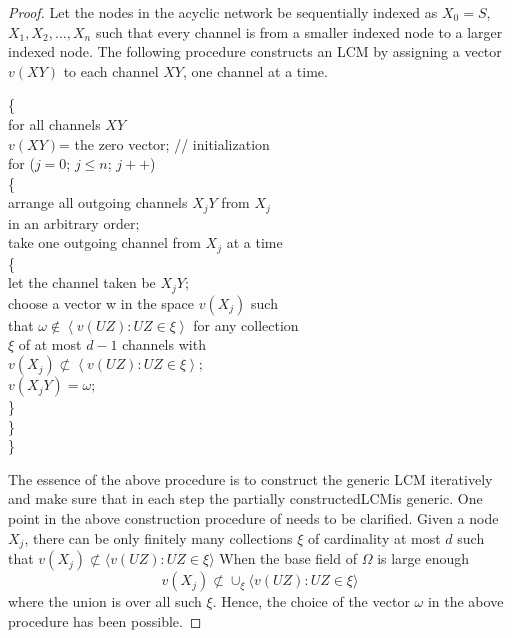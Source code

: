\documentclass[journal]{IEEEtran}
\newtheorem*{proof}{\hskip 2em Proof}
\begin{document}
\begin{proof}
	Let the nodes in the acyclic network be sequentially indexed as $X_0=S$, $X_1,X_2, \dots, X_n$ such that every channel is from a smaller indexed node to a larger indexed node. The following procedure constructs an LCM by assigning a vector $v(XY)$ to each channel $XY$, one channel at a time.
	\begin{tabbing}
		\{\\
		\quad for all channels $XY$\\
		\quad \quad $v(XY)$= the zero vector; // initialization\\
		\quad for ($j = 0$; $j \leq n$; $j++$)\\
		\quad \quad \{\\
		\quad \quad \quad arrange all outgoing channels $X_jY$ from $X_j$\\
		\quad \quad \quad in an arbitrary order;\\
		\quad \quad \quad take one outgoing channel from $X_j$ at a time\\
		\quad \quad \quad \{\\
		\quad \quad \quad \quad let the channel taken be $X_jY$;\\
		\quad \quad \quad \quad choose a vector w in the space $v(X_j)$ such\\
		\quad \quad \quad \quad that $\omega\notin\left \langle v(UZ):UZ\in \xi\right \rangle$ for any collection\\
		\quad \quad \quad \quad $\xi$ of at most $d-1$ channels with\\
		\quad \quad \quad \quad \quad \quad	$
			v(X_j)\nsubset \left \langle v(UZ):UZ\in\xi\right\rangle;
			$\\
		\quad \quad \quad \quad $v(X_jY)=\omega;$\\
		\quad \quad \quad \}\\
		\quad \quad \}\\
		\}\\
	\end{tabbing}
\par
The essence of the above procedure is to construct the generic LCM iteratively and make sure that in each step the partially constructedLCMis generic. One point in the above construction procedure of needs to be clarified. Given a node $X_j$, there can be only finitely many collections $\xi$ of cardinality at most $d$ such that $v(X_j)\nsubset \langle v(UZ):UZ\in \xi \rangle$ When the base field of $\Omega$ is large enough
$$
v(X_j)\nsubset \cup_{\xi}\langle v(UZ):UZ\in\xi\rangle
$$
where the union is over all such $\xi$. Hence, the choice of the vector $\omega$ in the above procedure has been possible.

\end{proof}
\end{document}
